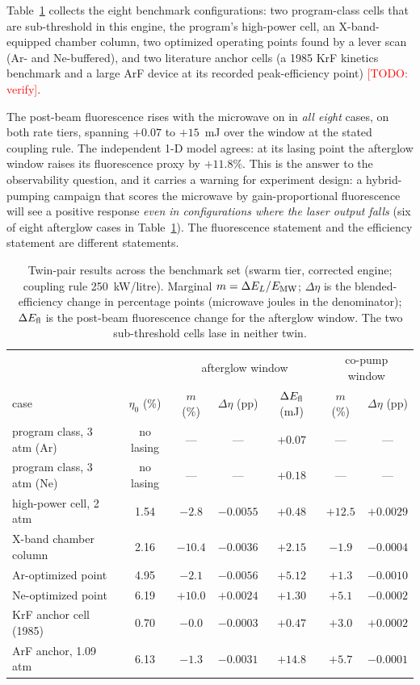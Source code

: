 \documentclass[aps,pra,preprint,longbibliography,nofootinbib]{revtex4-2}
\newcommand{\todo}[1]{\textcolor{red}{[TODO: #1]}}
\begin{document}
Table~\ref{tab:bench} collects the eight benchmark configurations: two
program-class cells that are sub-threshold in this engine, the
program's high-power cell, an X-band-equipped chamber column, two
optimized operating points found by a lever scan (Ar- and Ne-buffered),
and two literature anchor cells (a 1985 KrF kinetics benchmark and a
large ArF device at its recorded peak-efficiency point)
\cite{kannari,electra}\todo{verify}.

The post-beam fluorescence rises with the microwave on in \emph{all
eight} cases, on both rate tiers, spanning $+0.07$ to $+15$~mJ over the
window at the stated coupling rule. The independent 1-D model agrees:
at its lasing point the afterglow window raises its fluorescence proxy
by $+11.8\%$. This is the answer to the observability question, and it
carries a warning for experiment design: a hybrid-pumping campaign that
scores the microwave by gain-proportional fluorescence will see a
positive response \emph{even in configurations where the laser output
falls} (six of eight afterglow cases in Table~\ref{tab:bench}). The
fluorescence statement and the efficiency statement are different
statements.

\begin{table}[t]
\caption{\label{tab:bench}Twin-pair results across the benchmark set
(swarm tier, corrected engine; coupling rule 250~kW/litre). Marginal
$m=\Delta E_L/E_{\rm MW}$; $\Delta\eta$ is the blended-efficiency
change in percentage points (microwave joules in the denominator);
$\Delta E_{\rm fl}$ is the post-beam fluorescence change for the
afterglow window. The two sub-threshold cells lase in neither twin.}
\begin{ruledtabular}
\begin{tabular}{lcccccc}
 & & \multicolumn{3}{c}{afterglow window} &
 \multicolumn{2}{c}{co-pump window} \\
case & $\eta_0$ (\%) & $m$ (\%) & $\Delta\eta$ (pp) &
 $\Delta E_{\rm fl}$ (mJ) & $m$ (\%) & $\Delta\eta$ (pp) \\
\hline
program class, 3 atm (Ar)   & no lasing & --- & --- & $+0.07$ & --- & --- \\
program class, 3 atm (Ne)   & no lasing & --- & --- & $+0.18$ & --- & --- \\
high-power cell, 2 atm      & 1.54 & $-2.8$  & $-0.0055$ & $+0.48$ & $+12.5$ & $+0.0029$ \\
X-band chamber column       & 2.16 & $-10.4$ & $-0.0036$ & $+2.15$ & $-1.9$  & $-0.0004$ \\
Ar-optimized point          & 4.95 & $-2.1$  & $-0.0056$ & $+5.12$ & $+1.3$  & $-0.0010$ \\
Ne-optimized point          & 6.19 & $\mathbf{+10.0}$ & $\mathbf{+0.0024}$ & $+1.30$ & $+5.1$ & $-0.0002$ \\
KrF anchor cell (1985)      & 0.70 & $-0.0$  & $-0.0003$ & $+0.47$ & $+3.0$  & $+0.0002$ \\
ArF anchor, 1.09 atm        & 6.13 & $-1.3$  & $-0.0031$ & $+14.8$ & $+5.7$  & $-0.0001$ \\
\end{tabular}
\end{ruledtabular}
\end{table}
\end{document}
